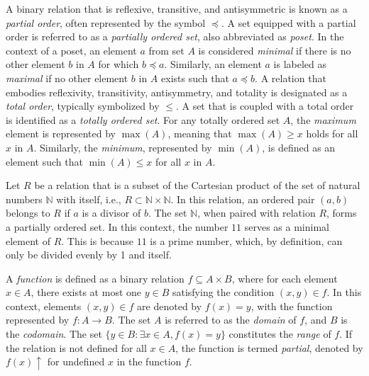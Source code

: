A binary relation that is reflexive, transitive, and antisymmetric is known as a \emph{partial order}, often represented by the symbol $\preceq$. A set equipped with a partial order is referred to as a \emph{partially ordered set}, also abbreviated as \emph{poset}. In the context of a poset, an element $a$ from set $A$ is considered \emph{minimal} if there is no other element $b$ in $A$ for which $b \preceq a$. Similarly, an element $a$ is labeled as \emph{maximal} if no other element $b$ in $A$ exists such that $a \preceq b$. A relation that embodies reflexivity, transitivity, antisymmetry, and totality is designated as a \emph{total order}, typically symbolized by $\leq$. A set that is coupled with a total order is identified as a \emph{totally ordered set}. For any totally ordered set $A$, the \emph{maximum} element is represented by $\max(A)$, meaning that $\max(A) \geq x$ holds for all $x$ in $A$. Similarly, the \emph{minimum}, represented by $\min(A)$, is defined as an element such that $\min(A) \leq x$ for all $x$ in $A$.

\begin{example}
Let $R$ be a relation that is a subset of the Cartesian product of the set of natural numbers $\mathbb{N}$ with itself, i.e., $R \subset \mathbb{N} \times \mathbb{N}$. In this relation, an ordered pair $(a, b)$ belongs to $R$ if $a$ is a divisor of $b$. The set $\mathbb{N}$, when paired with relation $R$, forms a partially ordered set. In this context, the number $11$ serves as a minimal element of $R$. This is because $11$ is a prime number, which, by definition, can only be divided evenly by 1 and itself.
\end{example}


A \emph{function} is defined as a binary relation $f \subseteq A \times B$, where for each element $x \in A$, there exists at most one $y \in B$ satisfying the condition $\left(x, y\right) \in f$. In this context, elements $\left(x, y\right) \in f$ are denoted by $f(x)=y$, with the function represented by $f : A \rightarrow B$. The set $A$ is referred to as the \emph{domain} of $f$, and $B$ is the \emph{codomain}. The set $\{ y \in B : \exists x \in A , f(x) = y\}$ constitutes the \emph{range} of $f$. If the relation is not defined for all $x \in A$, the function is termed \emph{partial}, denoted by $f(x) \uparrow$ for undefined $x$ in the function $f$. 

